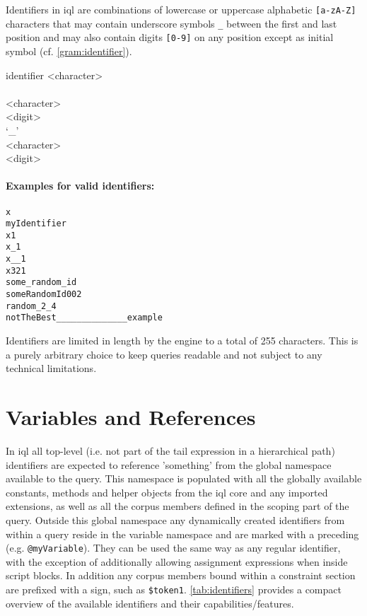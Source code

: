 \documentclass[11pt,a4paper]{report}
\begin{document}
\noindent Identifiers in \ac{iql} are combinations of lowercase or uppercase alphabetic \texttt{[a-zA-Z]} characters that may contain underscore symbols \texttt{\_} between the first and last position and may also contain digits \texttt{[0-9]} on any position except as initial symbol (cf. \cref{gram:identifier}).

\begin{gram}
	\label{gram:identifier}
	\begin{rrdiag*}{identifier}
		<character> \sst \\ 
			\sst \\ \srp \sst <character> \\ <digit> \\ `\_' \est \\ \erp \est
				 \\ <digit> \est
		\est
	\end{rrdiag*}
\end{gram}

\paragraph{Examples for valid identifiers:}

\begin{Verbatim}[samepage=true]
x
myIdentifier
x1
x_1
x__1
x321
some_random_id
someRandomId002
random_2_4
notTheBest______________example
\end{Verbatim}

\noindent Identifiers are limited in length by the engine to a total of 255 characters. This is a purely arbitrary choice to keep queries readable and not subject to any technical limitations.

\section{Variables and References}
\label{sec:variables-references}

In \ac{iql} all top-level (i.e. not part of the tail expression in a hierarchical path) identifiers are expected to reference 'something' from the global namespace available to the query. This namespace is populated with all the globally available constants, methods and helper objects from the \ac{iql} core and any imported extensions, as well as all the corpus members defined in the scoping part of the query. Outside this global namespace any dynamically created identifiers from within a query reside in the variable namespace and are marked with a preceding  (e.g. \texttt{@myVariable}). They can be used the same way as any regular identifier, with the exception of additionally allowing assignment expressions when inside script blocks. In addition any corpus members bound within a constraint section are prefixed with a \lit{\$} sign, such as \texttt{\$token1}. \cref{tab:identifiers} provides a compact overview of the available identifiers and their capabilities/features.
\end{document}
